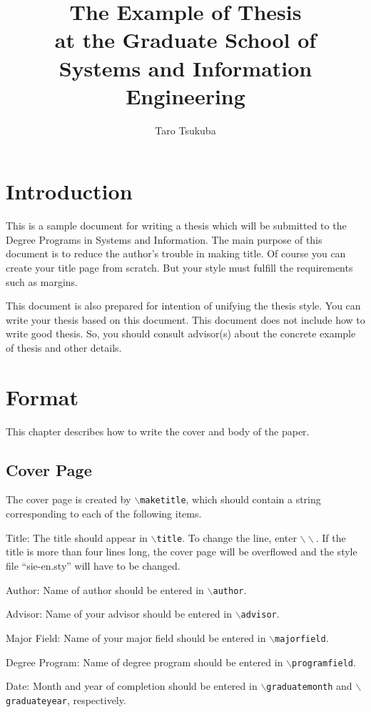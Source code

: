 \documentclass[12pt, a4paper]{report}
\title{The Example of Thesis \\ at the Graduate School of \\ Systems and Information Engineering}
\author{Taro Tsukuba}
\begin{document}
\maketitle
\makeabstract
\maketableofcontents


\chapter{Introduction}

This is a sample document for writing a thesis which will be submitted to the Degree
Programs in Systems and Information. The main purpose of this document is to reduce
the author's trouble in making title. Of course you can create your title page from
scratch. But your style must fulfill the requirements such as margins.

This document is also prepared for intention of unifying the thesis style. You can
write your thesis based on this document. This document does not include how to
write good thesis. So, you should consult advisor(s) about the concrete example of thesis
and other details.

\chapter{Format}

This chapter describes how to write the cover and body of the paper.

\section{Cover Page}

The cover page is created by {\tt $\backslash$maketitle}, which should
contain a string corresponding to each of the following items.


\begin{description} \parskip=1pt
\item{Title:}
  The title should appear in {\tt $\backslash$title}.  To change the line, enter $\backslash\backslash$.
  If the title is more than four lines long, the cover page will be overflowed and the style file ``sie-en.sty'' will have to be changed.
\item{Author:}
  Name of author should be entered in {\tt $\backslash$author}.
\item{Advisor:}
  Name of your advisor should be entered in {\tt $\backslash$advisor}.
\item{Major Field:}
  Name of your major field should be entered in {\tt $\backslash$majorfield}.
\item{Degree Program:}
  Name of degree program should be entered in {\tt $\backslash$programfield}.
\item{Date:}
  Month and year of completion should be entered in {\tt $\backslash$graduatemonth} and {\tt $\backslash$graduateyear}, respectively. 
\end{description}
\end{document}
